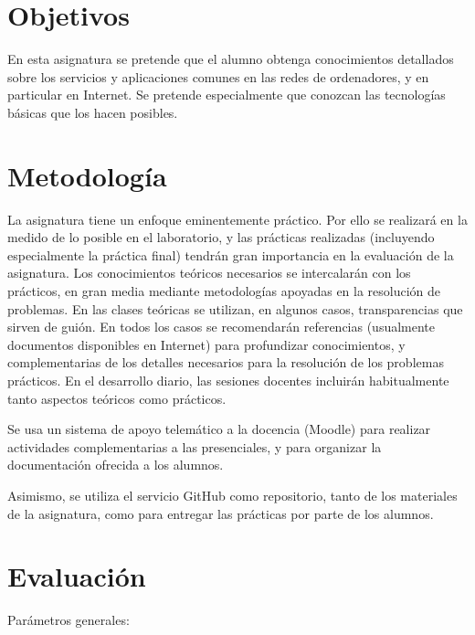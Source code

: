 \documentclass[a4paper,12pt]{article}
\begin{document}
\section{Objetivos}

En esta asignatura se pretende que el alumno obtenga conocimientos detallados sobre los servicios y aplicaciones comunes en las redes de ordenadores, y en particular en Internet. Se pretende especialmente que conozcan las tecnologías básicas que los hacen posibles.

\section{Metodología}

La asignatura tiene un enfoque eminentemente práctico. Por ello se realizará en la medido de lo posible en el laboratorio, y las prácticas realizadas (incluyendo especialmente la práctica final) tendrán gran importancia en la evaluación de la asignatura. Los conocimientos teóricos necesarios se intercalarán con los prácticos, en gran media mediante metodologías apoyadas en la resolución de problemas. En las clases teóricas se utilizan, en algunos casos, transparencias que sirven de guión. En todos los casos se recomendarán referencias (usualmente documentos disponibles en Internet) para profundizar conocimientos, y complementarias de los detalles necesarios para la resolución de los problemas prácticos. En el desarrollo diario, las sesiones docentes incluirán habitualmente tanto aspectos teóricos como prácticos.

Se usa un sistema de apoyo telemático a la docencia (Moodle) para realizar actividades complementarias a las presenciales, y para organizar la documentación ofrecida a los alumnos.

Asimismo, se utiliza el servicio GitHub como repositorio, tanto de los materiales de la
asignatura, como para entregar las prácticas por parte de los alumnos.

\newpage


\section{Evaluación}

Parámetros generales:
\end{document}
